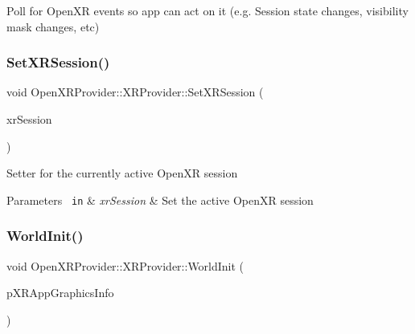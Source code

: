 Poll for Open\+XR events so app can act on it (e.\+g. Session state changes, visibility mask changes, etc) 

\mbox{\label{class_open_x_r_provider_1_1_x_r_provider_a96ffa9e4f37cc4967cf41fce027e5234}} 
\subsubsection{\texorpdfstring{SetXRSession()}{SetXRSession()}}
{\footnotesize\ttfamily void Open\+X\+R\+Provider\+::\+X\+R\+Provider\+::\+Set\+X\+R\+Session (\begin{DoxyParamCaption}\item[{Xr\+Session}]{xr\+Session }\end{DoxyParamCaption})\hspace{0.3cm}{\ttfamily [inline]}}

Setter for the currently active Open\+XR session 
\begin{DoxyParams}[1]{Parameters}
\mbox{\texttt{ in}}  & {\em xr\+Session} & Set the active Open\+XR session \\
\hline
\end{DoxyParams}
\mbox{\label{class_open_x_r_provider_1_1_x_r_provider_a381bae7b1021638036878cad1c0ea3c2}} 
\subsubsection{\texorpdfstring{WorldInit()}{WorldInit()}}
{\footnotesize\ttfamily void Open\+X\+R\+Provider\+::\+X\+R\+Provider\+::\+World\+Init (\begin{DoxyParamCaption}\item[{\mbox{\hyperlink{struct_open_x_r_provider_1_1_x_r_app_graphics_info}{X\+R\+App\+Graphics\+Info}} $\ast$}]{p\+X\+R\+App\+Graphics\+Info }\end{DoxyParamCaption})\hspace{0.3cm}{\ttfamily [private]}}

